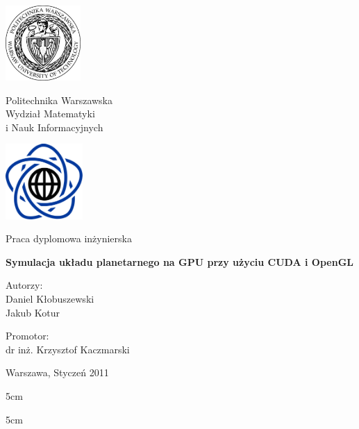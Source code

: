 \thispagestyle{empty}
\begin{center}
\Large

\begin{minipage}{0.2\linewidth}
\centering
\includegraphics[height=2.86cm]{img/logo_pw.pdf}
\end{minipage}
\begin{minipage}{0.55\linewidth}
\centering
Politechnika Warszawska \\[0.5em] Wydział Matematyki \\ i Nauk Informacyjnych
\end{minipage}
\begin{minipage}{0.2\linewidth}
\centering
\includegraphics[height=2.86cm]{img/logo_mini.pdf}
\end{minipage}

\vspace{2em}
Praca dyplomowa inżynierska
\vspace{5em}

\huge
\textbf{Symulacja układu planetarnego na GPU przy użyciu CUDA i OpenGL}

\large

\vspace{4em}

\hfill
\begin{minipage}{0.4\linewidth}
Autorzy:
\vspace{0.5em}
\\
Daniel Kłobuszewski
\\
Jakub Kotur

\vspace{1em}

Promotor:
\vspace{0.5em}
\\
dr inż. Krzysztof Kaczmarski
\end{minipage}

\vfill
Warszawa, Styczeń 2011
\end{center}

\newpage
\thispagestyle{empty}

\mbox{}
\vfill

\begin{center}
\signature{Podpis promotora}{5cm}
\hspace{3cm}
\signature{Podpis autora}{5cm}
\end{center}
